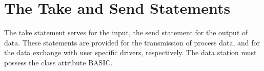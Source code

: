 
\section{The Take and Send Statements}    %
\label{sec_take_send}

The take statement serves for the input, the send statement for the
output of data. These statements are provided for the transmission of
process data, and for the data exchange with user specific drivers,
respectively. The data station must possess the class attribute BASIC.





